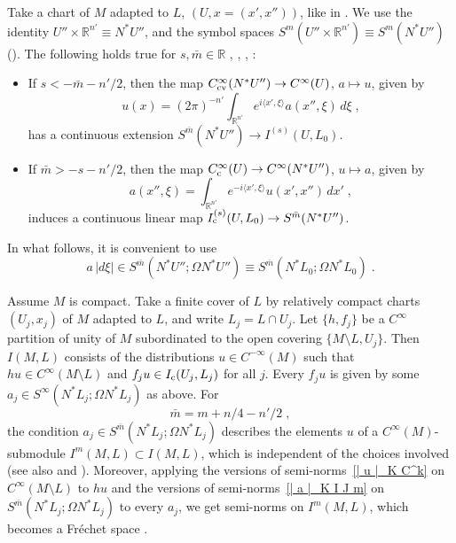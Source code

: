 \documentclass{memo-l}
\theoremstyle{plain}
\theoremstyle{definition}
\theoremstyle{remark}
\newcommand{\R}{\mathbb{R}}
\newcommand{\co}{{\text{\rm c}}}
\newcommand{\Cinftyc}{C^\infty_{\text{\rm c}}}
\newcommand{\Cinftycv}{C^\infty_{\text{\rm cv}}}
\numberwithin{section}{chapter}
\numberwithin{equation}{section}%
\begin{document}
Take a chart of $M$ adapted to $L$, $(U,x=(x',x''))$, like in . We use the identity $U''\times\R^{n'}\equiv N^*U''$, and the symbol spaces $S^m(U''\times\R^{n'})\equiv S^m(N^*U'')$ (). The following holds true for $s,\bar m\in\R$ \cite[Theorem~18.2.8]{Hormander1985-III}, \cite[Proposition~6.1.1]{Melrose1996}, \cite[Lemma~9.33]{MelroseUhlmann2008}, \cite[Remark~4.4]{AlvKordyLeichtnam-conormal}:
\begin{itemize}
\item If $s<-\bar m-n'/2$, then the map $\Cinftycv(N^*U'')\to C^\infty(U)$, $a\mapsto u$, given by
\[
u(x)=(2\pi)^{-n'}\int_{\R^{n'}}e^{i\langle x',\xi\rangle}a(x'',\xi)\,d\xi\;,
\]
has a continuous extension $S^{\bar m}(N^*U'')\to I^{(s)}(U,L_0)$.
\item If $\bar m>-s-n'/2$, then the map $\Cinftyc(U)\to C^\infty(N^*U'')$, $u\mapsto a$, given by
\[
a(x'',\xi)=\int_{\R^{n'}}e^{-i\langle x',\xi\rangle}u(x',x'')\,dx'\;,
\]
induces a continuous linear map $I_\co^{(s)}(U,L_0)\to S^{\bar m}(N^*U'')$.
\end{itemize}
In what follows, it is convenient to use
\[
a\,|d\xi|\in S^{\bar m}(N^*U'';\Omega N^*U'')\equiv S^{\bar m}(N^*L_0;\Omega N^*L_0)\;.
\]

Assume $M$ is compact. Take a finite cover of $L$ by relatively compact charts $(U_j,x_j)$ of $M$ adapted to $L$, and write $L_j=L\cap U_j$. Let $\{h,f_j\}$ be a $C^\infty$ partition of unity of $M$ subordinated to the open covering $\{M\setminus L,U_j\}$. Then $I(M,L)$ consists of the distributions $u\in C^{-\infty}(M)$ such that $hu\in C^\infty(M\setminus L)$ and $f_ju\in I_\co(U_j,L_j)$ for all $j$. Every $f_ju$ is given by some $a_j\in S^\infty(N^*L_j;\Omega N^*L_j)$ as above. For
\begin{equation}\label{bar m}
\bar m=m+n/4-n'/2\;,
\end{equation}
the condition $a_j\in S^{\bar m}(N^*L_j;\Omega N^*L_j)$ describes the elements $u$ of a $C^\infty(M)$-submodule $I^m(M,L)\subset I(M,L)$,  which is independent of the choices involved \cite[Proposition~9.33]{MelroseUhlmann2008} (see also \cite[Definition~6.2.19]{Melrose1996} and \cite[Definition~4.3.9]{Simanca1990}). Moreover, applying the versions of semi-norms~\eqref{| u |_K C^k} on $C^\infty(M\setminus L)$ to $hu$ and the versions of semi-norms~\eqref{| a |_K I J m} on $S^{\bar m}(N^*L_j;\Omega N^*L_j)$ to every $a_j$, we get semi-norms on $I^m(M,L)$, which becomes a Fr\'echet space \cite[Sections~6.2 and 6.10]{Melrose1996}.
\end{document}
